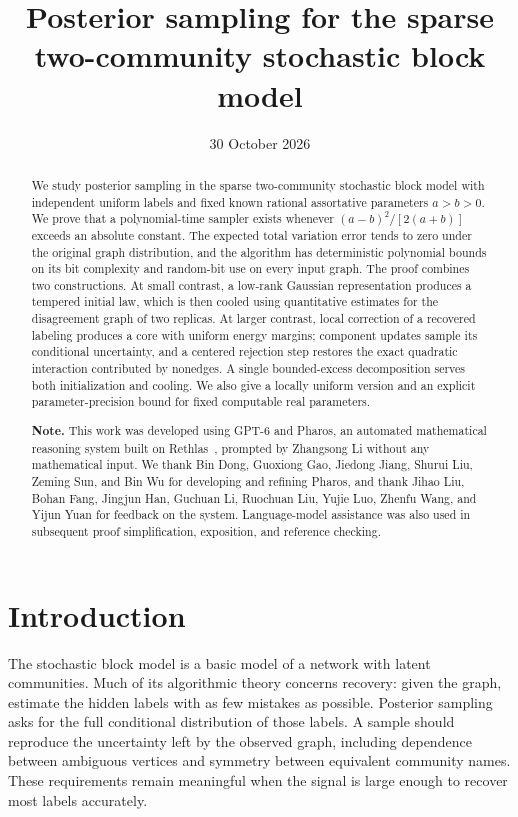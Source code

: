 \documentclass[11pt]{article}
\title{Posterior sampling for the sparse two-community stochastic block model}
\author{}
\date{30 October 2026}
\numberwithin{equation}{section}
\begin{document}
\maketitle

\begin{abstract}
We study posterior sampling in the sparse two-community stochastic block model with independent uniform labels and fixed known rational assortative parameters $a>b>0$. We prove that a polynomial-time sampler exists whenever $(a-b)^2/[2(a+b)]$ exceeds an absolute constant. The expected total variation error tends to zero under the original graph distribution, and the algorithm has deterministic polynomial bounds on its bit complexity and random-bit use on every input graph. The proof combines two constructions. At small contrast, a low-rank Gaussian representation produces a tempered initial law, which is then cooled using quantitative estimates for the disagreement graph of two replicas. At larger contrast, local correction of a recovered labeling produces a core with uniform energy margins; component updates sample its conditional uncertainty, and a centered rejection step restores the exact quadratic interaction contributed by nonedges. A single bounded-excess decomposition serves both initialization and cooling. We also give a locally uniform version and an explicit parameter-precision bound for fixed computable real parameters.

{\bf Note.} This work was developed using GPT-6 and Pharos, an automated mathematical reasoning system built on Rethlas~\cite{Ju26}, prompted by Zhangsong Li without any mathematical input. We thank Bin Dong, Guoxiong Gao, Jiedong Jiang, Shurui Liu, Zeming Sun, and Bin Wu for developing and refining Pharos, and thank Jihao Liu, Bohan Fang, Jingjun Han, Guchuan Li, Ruochuan Liu, Yujie Luo, Zhenfu Wang, and Yijun Yuan for feedback on the system. Language-model assistance was also used in subsequent proof simplification, exposition, and reference checking.
\end{abstract}

\tableofcontents

\section{Introduction}\label{sec:intro}

The stochastic block model is a basic model of a network with latent communities. Much of its algorithmic theory concerns recovery: given the graph, estimate the hidden labels with as few mistakes as possible. Posterior sampling asks for the full conditional distribution of those labels. A sample should reproduce the uncertainty left by the observed graph, including dependence between ambiguous vertices and symmetry between equivalent community names. These requirements remain meaningful when the signal is large enough to recover most labels accurately.
\end{document}
